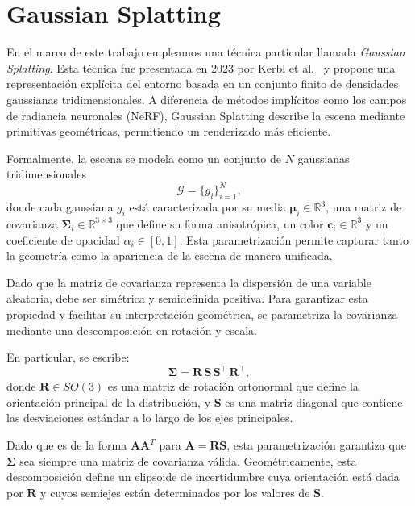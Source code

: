 \section{Gaussian Splatting}
\label{gaussian_splatting}

En el marco de este trabajo empleamos una técnica particular llamada \emph{Gaussian Splatting}. Esta técnica fue presentada en 2023 por Kerbl et al.~\cite{kerbl2023gaussian} y propone una representación explícita del entorno basada en un conjunto finito de densidades gaussianas tridimensionales. A diferencia de métodos implícitos como los campos de radiancia neuronales (NeRF), Gaussian Splatting describe la escena mediante primitivas geométricas, permitiendo un renderizado más eficiente.

Formalmente, la escena se modela como un conjunto de $N$ gaussianas tridimensionales
$$
\mathcal{G} = \{ g_i \}_{i=1}^N,
$$
donde cada gaussiana $g_i$ está caracterizada por su media $\boldsymbol{\mu}_i \in \mathbb{R}^3$, una matriz de covarianza $\boldsymbol{\Sigma}_i \in \mathbb{R}^{3 \times 3}$ que define su forma anisotrópica, un color $\mathbf{c}_i \in \mathbb{R}^3$ y un coeficiente de opacidad $\alpha_i \in [0,1]$. Esta parametrización permite capturar tanto la geometría como la apariencia de la escena de manera unificada.

Dado que la matriz de covarianza representa la dispersión de una variable aleatoria, debe ser simétrica y semidefinida positiva. Para garantizar esta propiedad y facilitar su interpretación geométrica, se parametriza la covarianza mediante una descomposición en rotación y escala.

En particular, se escribe:
\begin{equation}
\boldsymbol{\Sigma}
=
\mathbf{R}\,\mathbf{S}\,\mathbf{S}^\top\,\mathbf{R}^\top,
\end{equation}
donde \(\mathbf{R} \in SO(3)\) es una matriz de rotación ortonormal que define la orientación principal de la distribución, y \(\mathbf{S}\) es una matriz diagonal que contiene las desviaciones estándar a lo largo de los ejes principales.

Dado que es de la forma $\mathbf{A}\mathbf{A}^T$ para $\mathbf{A}=\mathbf{R}\mathbf{S}$, esta parametrización garantiza que \(\boldsymbol{\Sigma}\) sea siempre una matriz de covarianza válida. Geométricamente, esta descomposición define un elipsoide de incertidumbre cuya orientación está dada por \(\mathbf{R}\) y cuyos semiejes están determinados por los valores de \(\mathbf{S}\).




